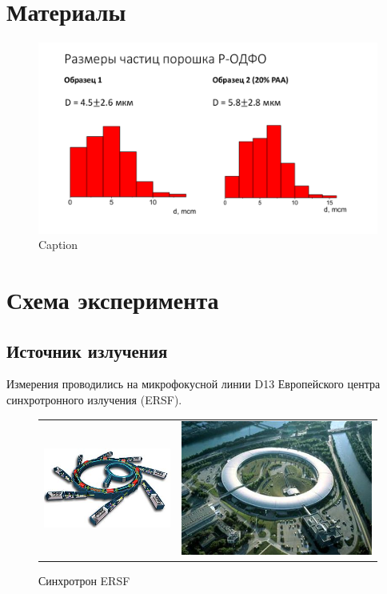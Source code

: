 

	\section{Материалы}
	
	
	\begin{figure}[h]
	    \centering
	    \includegraphics[width=\linewidth]{fig/particles}
	    \caption{Caption}
	    \label{fig:my_label}
	\end{figure}
	
	\section{Схема эксперимента}
	\subsection{Источник излучения}
	
	Измерения проводились на микрофокусной линии D13 Европейского центра синхротронного излучения (ERSF).
	
		\begin{figure}[h]\center
\begin{tabular}{cc}
\includegraphics[width=0.5\linewidth]{fig/pribor-scheme.jpg}
&
\includegraphics[width=0.5\linewidth]{fig/pribor-photo.jpg}
\end{tabular}
\caption{Синхротрон ERSF}
\end{figure}
	
